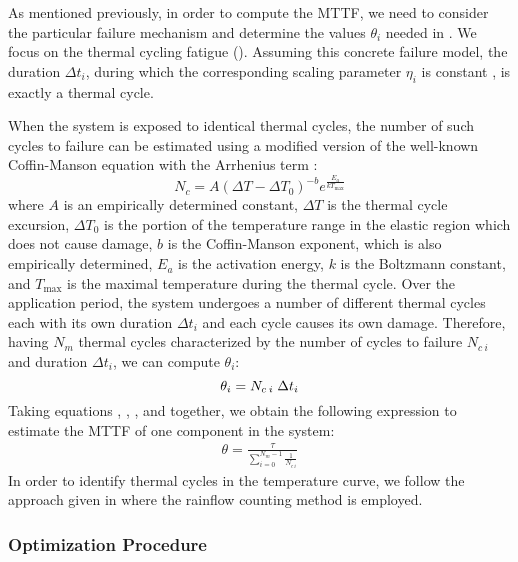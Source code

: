 As mentioned previously, in order to compute the MTTF, we need to consider the
particular failure mechanism and determine the values $\theta_i$ needed in
. We focus on the thermal cycling fatigue
(). Assuming this concrete failure model, the duration
$\Delta t_i$, during which the corresponding scaling parameter $\eta_i$ is
constant , is exactly a thermal cycle.

When the system is exposed to identical thermal cycles, the number of such
cycles to failure can be estimated using a modified version of the well-known
Coffin-Manson equation with the Arrhenius term \cite{xiang2010, jedec2010}:
\[
  N_c = A (\Delta T - \Delta T_0)^{-b} e^{\frac{E_a}{k T_\text{max}}}
\]
where $A$ is an empirically determined constant, $\Delta T$ is the thermal cycle
excursion, $\Delta T_0$ is the portion of the temperature range in the elastic
region which does not cause damage, $b$ is the Coffin-Manson exponent, which is
also empirically determined, $E_{a}$ is the activation energy, $k$ is the
Boltzmann constant, and $T_\text{max}$ is the maximal temperature during the
thermal cycle. Over the application period, the system undergoes a number of
different thermal cycles each with its own duration $\Delta t_i$ and each cycle
causes its own damage. Therefore, having $N_m$ thermal cycles characterized by
the number of cycles to failure $N_{c\:i}$ and duration $\Delta t_i$, we can
compute $\theta_i$:
\begin{equation} \elab{mttf-cycle}
  \theta_i = N_{c \: i} \; \Delta t_i
\end{equation}
Taking equations , , , and
 together, we obtain the following expression to estimate the
MTTF of one component in the system:
\begin{align}
  \theta = \frac{\tau}{\sum_{i=0}^{N_m - 1} \frac{1}{N_{c \: i}}}
\end{align}
In order to identify thermal cycles in the temperature curve, we follow the
approach given in \cite{xiang2010} where the rainflow counting method is
employed.

\subsubsection{Optimization Procedure} 

